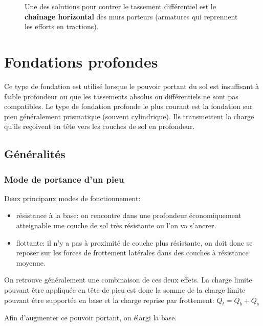 \begin{figure}[h!]
            Une des solutions pour contrer le tassement différentiel est le \textbf{chaînage horizontal} des murs porteurs (armatures qui reprennent les efforts en tractions).
            \end{figure}
            
            
\section{Fondations profondes}
    
    Ce type de fondation est utilisé lorsque le pouvoir portant du sol est insuffisant à faible profondeur ou que les tassements absolus ou différentiels ne sont pas compatibles. Le type de fondation profonde le plus courant est la fondation sur pieu généralement prismatique (souvent cylindrique). Ils transmettent la charge qu'ils reçoivent en tête vers les couches de sol en profondeur.
    
    \subsection{Généralités}
    
        \subsubsection{Mode de portance d'un pieu}
        
        Deux principaux modes de fonctionnement:
        \begin{itemize}
            \item résistance à la base: on rencontre dans une profondeur économiquement atteignable une couche de sol très résistante ou l'on va s'ancrer.
            \item flottante: il n'y a pas à proximité de couche plus résistante, on doit donc se reposer sur les forces de frottement latérales dans des couches à résistance moyenne.
        \end{itemize} 
        
        On retrouve généralement une combinaison de ces deux effets. La charge limite pouvant être appliquée en tête de pieu est donc la somme de la charge limite pouvant être supportée en base et la charge reprise par frottement: $Q_t = Q_b + Q_s$ 
        
        Afin d'augmenter ce pouvoir portant, on élargi la base.
        
